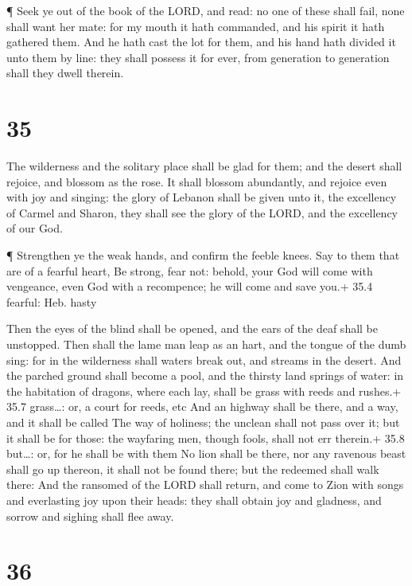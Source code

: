  ¶ Seek ye out of the book of the LORD, and read: no one of
these shall fail, none shall want her mate: for my mouth it hath
commanded, and his spirit it hath gathered them.  And he
hath cast the lot for them, and his hand hath divided it unto them by
line: they shall possess it for ever, from generation to generation
shall they dwell therein.

\hypertarget{section-34}{%
\section{35}\label{section-34}}

 The wilderness and the solitary place shall be glad for
them; and the desert shall rejoice, and blossom as the rose.
 It shall blossom abundantly, and rejoice even with joy and
singing: the glory of Lebanon shall be given unto it, the excellency of
Carmel and Sharon, they shall see the glory of the LORD, and the
excellency of our God.

 ¶ Strengthen ye the weak hands, and confirm the feeble
knees.  Say to them that are of a fearful heart, Be strong,
fear not: behold, your God will come with vengeance, even God with a
recompence; he will come and save you.+ 35.4 fearful: Heb. hasty

 Then the eyes of the blind shall be opened, and the ears of
the deaf shall be unstopped.  Then shall the lame man leap
as an hart, and the tongue of the dumb sing: for in the wilderness shall
waters break out, and streams in the desert.  And the
parched ground shall become a pool, and the thirsty land springs of
water: in the habitation of dragons, where each lay, shall be grass with
reeds and rushes.+ 35.7 grass\ldots: or, a court for reeds, etc
 And an highway shall be there, and a way, and it shall be
called The way of holiness; the unclean shall not pass over it; but it
shall be for those: the wayfaring men, though fools, shall not err
therein.+ 35.8 but\ldots: or, for he shall be with them  No
lion shall be there, nor any ravenous beast shall go up thereon, it
shall not be found there; but the redeemed shall walk there:
 And the ransomed of the LORD shall return, and come to
Zion with songs and everlasting joy upon their heads: they shall obtain
joy and gladness, and sorrow and sighing shall flee away.

\hypertarget{section-35}{%
\section{36}\label{section-35}}

